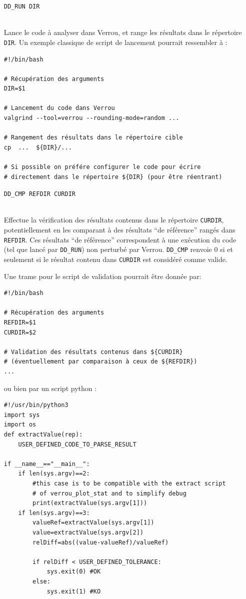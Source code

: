 \documentclass[a4paper]{article}
\def\mdfilename{File}
\newenvironment{file}[1][Fichier]{
  \def\mdfilename{#1}
  \begin{mdframed}[style=file]
}{
  \end{mdframed}
}
\begin{document}
\begin{itemize}
\item[\tt DD\_RUN DIR]\strut\\
  Lance le code à analyser dans Verrou, et range les résultats dans le
  répertoire \texttt{DIR}. Un exemple classique de script de lancement pourrait
  ressembler à :

\begin{file}[ddRun]
\begin{verbatim}
#!/bin/bash

# Récupération des arguments
DIR=$1

# Lancement du code dans Verrou
valgrind --tool=verrou --rounding-mode=random ...

# Rangement des résultats dans le répertoire cible
cp  ...  ${DIR}/...

# Si possible on préfére configurer le code pour écrire
# directement dans le répertoire ${DIR} (pour être réentrant)

\end{verbatim}
\end{file}

  \medskip
\item[\tt DD\_CMP REFDIR CURDIR]\strut\\
  Effectue la vérification des résultats contenus dans le répertoire
  \texttt{CURDIR}, potentiellement en les comparant à des résultats ``de
  référence'' rangés dans \texttt{REFDIR}. Ces résultats ``de référence''
  correspondent à une exécution du code (tel que lancé par \texttt{DD\_RUN}) non
  perturbé par Verrou. \texttt{DD\_CMP} renvoie 0 si et seulement si le résultat
  contenu dans \texttt{CURDIR} est considéré comme valide.

  Une trame pour le script de validation pourrait être donnée par:
\begin{file}[ddCmp]
\begin{verbatim}
#!/bin/bash

# Récupération des arguments
REFDIR=$1
CURDIR=$2

# Validation des résultats contenus dans ${CURDIR}
# (éventuellement par comparaison à ceux de ${REFDIR})
...
\end{verbatim}
\end{file}
ou bien par un script python :
\begin{file}[ddCmp.py]
\begin{verbatim}
#!/usr/bin/python3
import sys
import os
def extractValue(rep):
    USER_DEFINED_CODE_TO_PARSE_RESULT

if __name__=="__main__":
    if len(sys.argv)==2:
        #this case is to be compatible with the extract script
        # of verrou_plot_stat and to simplify debug
        print(extractValue(sys.argv[1]))
    if len(sys.argv)==3:
        valueRef=extractValue(sys.argv[1])
        value=extractValue(sys.argv[2])
        relDiff=abs((value-valueRef)/valueRef)

        if relDiff < USER_DEFINED_TOLERANCE:
            sys.exit(0) #OK
        else:
            sys.exit(1) #KO
\end{verbatim}
\end{file}

\end{itemize}
\end{document}
